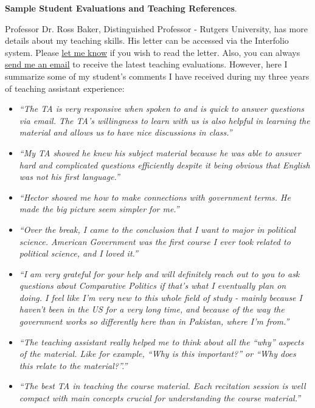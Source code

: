 
\newpage
{\bf Sample Student Evaluations and Teaching References}. 

Professor Dr. Ross Baker, Distinguished Professor - Rutgers University, has more details about my teaching skills. His letter can be accessed via the Interfolio system. Please \href{mailto:bahamondeh@gmail.com}{let me know} if you wish to read the letter. Also, you can always \href{mailto:bahamondeh@gmail.com}{send me an email} to receive the latest teaching evaluations. However, here I summarize some of my student's comments I have received during my three years of teaching assistant experience:


{\scriptsize
\begin{itemize}

\item \emph{``The TA is very responsive when spoken to and is quick to answer questions via email. The TA's willingness to learn with us is also helpful in learning the material and allows us to have nice discussions in class.''}

\item \emph{``My TA showed he knew his subject material because he was able to answer hard and complicated questions efficiently despite it being obvious that English was not his first language.''}

\item \emph{``Hector showed me how to make connections with government terms. He made the big picture seem simpler for me.''}

\item \emph{``Over the break, I came to the conclusion that I want to major in political science. American Government was the first course I ever took related to political science, and I loved it.''}

\item \emph{``I am very grateful for your help and will definitely reach out to you to ask questions about Comparative Politics if that's what I eventually plan on doing. I feel like I'm very new to this whole field of study - mainly because I haven't been in the US for a very long time, and because of the way the government works so differently here than in Pakistan, where I'm from.''}

\item \emph{``The teaching assistant really helped me to think about all the ``why'' aspects of the material. Like for example, ``Why is this important?'' or ``Why does this relate to the material?''.''}

\item \emph{``The best TA in teaching the course material. Each recitation session is well compact with main concepts crucial for understanding the course material.''}


\end{itemize}}

